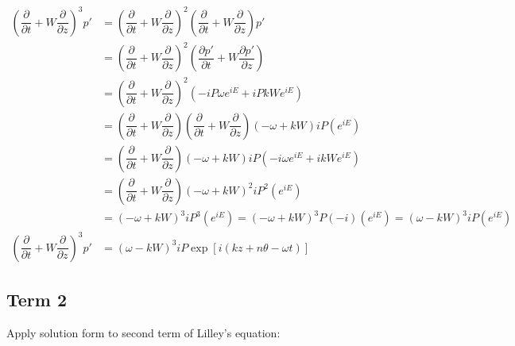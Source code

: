 \documentclass[]{aiaa-tc}%
\begin{document}
\begin{equation}
\begin{split}
\left( \dfrac{\partial}{\partial t} + W \dfrac{\partial}{\partial z} \right)^3 p'
&= \left( \dfrac{\partial}{\partial t} + W \dfrac{\partial}{\partial z}
   \right)^2
   \left( \dfrac{\partial}{\partial t} + W \dfrac{\partial}{\partial z}
   \right)p' \\
&= \left( \dfrac{\partial}{\partial t} + W \dfrac{\partial}{\partial z}
   \right)^2
   \left( \dfrac{\partial p'}{\partial t} + W \dfrac{\partial p'}{\partial z}
   \right) \\
&= \left( \dfrac{\partial}{\partial t} + W \dfrac{\partial}{\partial z}
   \right)^2
   \left( -iP\omega e^{iE} + iPkW e^{iE}
   \right) \\
&= \left( \dfrac{\partial}{\partial t} + W \dfrac{\partial}{\partial z}
   \right)
   \left( \dfrac{\partial}{\partial t} + W \dfrac{\partial}{\partial z}
   \right) (-\omega + kW)iP (e^{iE}) \\
&= \left( \dfrac{\partial}{\partial t} + W \dfrac{\partial}{\partial z}
   \right) (-\omega + kW)iP
   (-i\omega e^{iE} + ikW e^{iE}) \\
&= \left( \dfrac{\partial}{\partial t} + W \dfrac{\partial}{\partial z}
   \right) (-\omega + kW)^2iP^2 (e^{iE}) \\
&= (-\omega + kW)^3iP^3 (e^{iE}) = (-\omega + kW)^3P(-i) (e^{iE}) = (\omega - kW)^3iP (e^{iE}) \\
\left( \dfrac{\partial}{\partial t} + W \dfrac{\partial}{\partial z} \right)^3 p'
&= \boxed{(\omega - kW)^3iP \exp[i(kz + n\theta -\omega t)]}
\end{split}
\end{equation}


\subsection{Term 2}

Apply solution form to second term of Lilley's equation:
\end{document}
